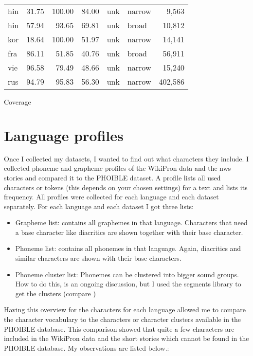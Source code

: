 {\begin{tabularx}{\textwidth}{|lrrrXXr|}
hin &     31.75 &  100.00 &   84.00 &      unk &    narrow &         9,563 \\
hin &     57.94 &   93.65 &   69.81 &      unk &     broad &        10,812 \\
kor &     18.64 &  100.00 &   51.97 &      unk &    narrow &        14,141 \\
fra &     86.11 &   51.85 &   40.76 &      unk &     broad &        56,911 \\
vie &     96.58 &   79.49 &   48.66 &      unk &    narrow &        15,240 \\
rus &     94.79 &   95.83 &   56.30 &      unk &    narrow &       402,586 \\
\hline
\end{tabularx}}{Coverage}

\section{Language profiles}
Once I collected my datasets, I wanted to find out what characters they include. I collected phoneme and grapheme profiles of the WikiPron data and the \ac{nws} stories and compared it to the PHOIBLE dataset. A profile lists all used characters or tokens (this depends on your chosen settings) for a text and lists its frequency. All profiles were collected for each language and each dataset separately. For each language and each dataset I got three lists:
\begin{itemize}
 \item Grapheme list: contains all graphemes in that language. Characters that need a base character like diacritics are shown together with their base character. 
 \item Phoneme list: contains all phonemes in that language. Again, diacritics and similar characters are shown with their base characters.
 \item Phoneme cluster list: Phonemes can be clustered into bigger sound groups. How to do this, is an ongoing discussion, but I used the segments library to get the clusters (compare \citet{unicode-lingu})
\end{itemize}

Having this overview for the characters for each language allowed me to compare the character vocabulary to the characters or character clusters available in the PHOIBLE database. This comparison showed that quite a few characters are included in the WikiPron data and the short stories which cannot be found in the PHOIBLE database. My observations are listed below.:

